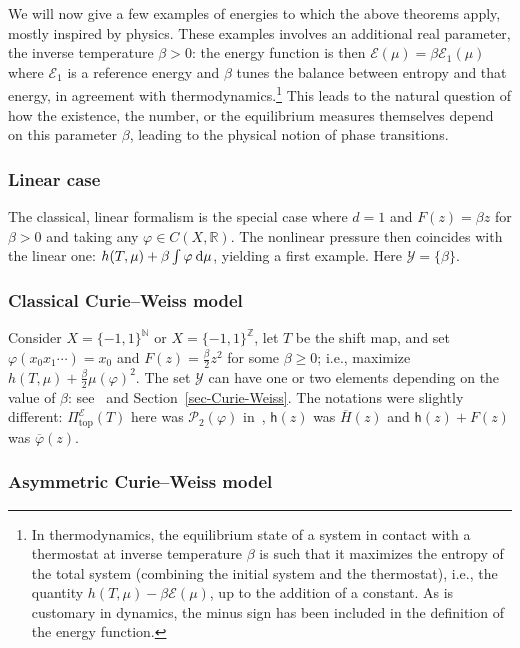 \documentclass[10pt]{amsart}
\theoremstyle{definition}\newtheorem{defi}[theo]{Definition}\newtheorem{rema}[theo]{Remark}\newtheorem{exam}[theo]{Example}\newtheorem{exem}[theo]{Example}\newtheorem{nota}[theo]{Notation}
\theoremstyle{plain}
\theoremstyle{plain}
\newcommand\NLP{\Pi}
\renewcommand\top{{\mathrm{top}}}
\newcommand*{\dd} {\relax\ifnum\lastnodetype>0\mskip\medmuskip\fi\mathrm{d}}
\newcommand{\hf}{\mathsf{h}}
\newcommand{\pot}{\varphi}
\newcounter{In}
\newcommand*\8{\infty}
\newcommand{\ol}{\overline}
\newcommand\NN{\mathbb{N}}
\newcommand\RR{\mathbb{R}}
\newcommand\ZZ{\mathbb{Z}}
\newcommand{\En}{\mathcal{E}}
\newcommand{\CP}{\mathcal{P}}
\newcommand{\scY}{\mathscr{Y}}
\begin{document}
We will now give a few examples of energies to which the above theorems apply, mostly inspired by physics. These examples involves an additional real parameter, the inverse temperature $\beta>0$: the energy function is then $\En(\mu)=\beta\En_1(\mu)$ where $\En_1$ is a reference energy and $\beta$ tunes the balance between entropy and that energy, in agreement with thermodynamics.\footnote{In thermodynamics, the equilibrium state of a system in contact with a thermostat at inverse temperature $\beta$ is such that it maximizes the entropy of the total system (combining the initial system and the thermostat), i.e., the quantity $h(T,\mu)-\beta\En(\mu)$, up to the addition of a constant. As is customary in dynamics, the minus sign has been included in the definition of the energy function.} This leads to the natural question of how the existence, the number, or the equilibrium measures themselves depend on this parameter $\beta$, leading to the physical notion of phase transitions.


\subsubsection{Linear case}

The classical, linear formalism is the special case where $d=1$ and $F(z)= \beta z$ for $\beta>0$ and taking any $\pot\in C(X,\RR)$. The nonlinear pressure then coincides with the linear one: $h(T,\mu)+\beta\int \pot \dd\mu$, yielding a first example. Here $\scY=\{\beta\}$.



\subsubsection{Classical Curie--Weiss model}

Consider $X=\{-1,1\}^{\NN}$ or $X=\{-1,1\}^{\ZZ}$, let $T$ be the shift map, and set $\pot(x_0x_1\cdots)=x_0$ and $F(z)=\frac\beta2z^2$ for some $\beta\ge 0$; i.e., maximize $h(T,\mu)+\frac\beta2\mu(\pot)^2$. The set $\scY$ can have one or two elements depending on the value of $\beta$: see~\cite{Leplaideur-Watbled} and Section~\ref{sec-Curie-Weiss}. { The notations were slightly different: $\NLP^\En_\top(T)$ here was $\CP_{2}(\pot)$ in~\cite{Leplaideur-Watbled}, $\hf(z)$ was $\ol{H}(z)$ and $\hf(z)+F(z)$ was $\ol\varphi(z)$.}


\subsubsection{Asymmetric Curie--Weiss model}
\end{document}
